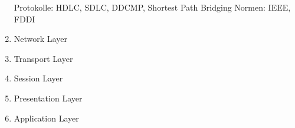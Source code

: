 \documentclass[11pt]{article}
\begin{document}
\begin{enumerate}
        Protokolle: HDLC, SDLC, DDCMP, Shortest Path Bridging
        Normen: IEEE, FDDI

        \item Network Layer
        \item Transport Layer
        \item Session Layer
        \item Presentation Layer
        \item Application Layer
    \end{enumerate}
\end{document}
